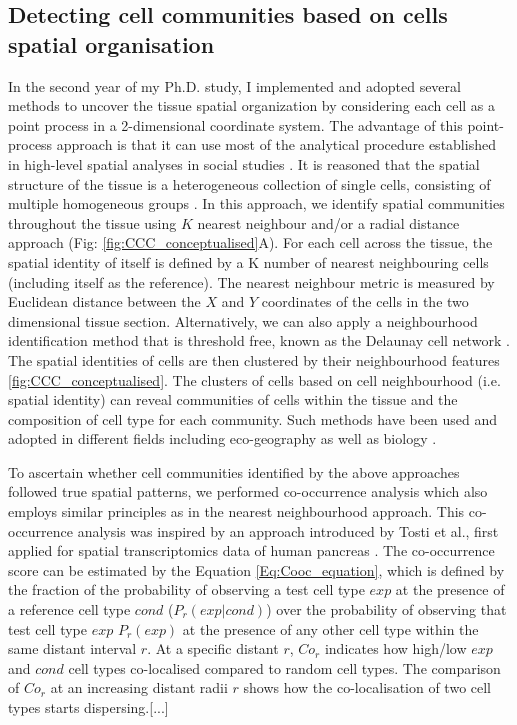\subsection{Detecting cell communities based on cells spatial organisation}
In the second year of my Ph.D. study, I implemented and adopted several methods to uncover the tissue spatial organization by considering each cell as a point process in a 2-dimensional coordinate system. The advantage of this point-process approach is that it can use most of the analytical procedure established in high-level spatial analyses in social studies \cite{yushimito2012voronoi}. It is reasoned that the spatial structure of the tissue is a heterogeneous collection of single cells, consisting of multiple homogeneous groups \cite{schurch2020coordinated}. In this approach, we identify spatial communities throughout the tissue using $K$ nearest neighbour and/or a radial distance approach (Fig: \ref{fig:CCC_conceptualised}A). For each cell across the tissue, the spatial identity of itself is defined by a K number of nearest neighbouring cells (including itself as the reference). The nearest neighbour metric is measured by Euclidean distance between the $X$ and $Y$ coordinates of the cells in the two dimensional tissue section. Alternatively, we can also apply a neighbourhood identification method that is threshold free, known as the Delaunay cell network \cite{guibas1985primitives, dries2021giotto}. The spatial identities of cells are then clustered by their neighbourhood features \ref{fig:CCC_conceptualised}. The clusters of cells based on cell neighbourhood (i.e. spatial identity) can reveal communities of cells within the tissue and the composition of cell type for each community. Such methods have been used and adopted in different fields including eco-geography as well as biology \cite{goltsev2018CODEX, dries2021giotto}.

To ascertain whether cell communities identified by the above approaches followed true spatial patterns, we performed co-occurrence analysis which also employs similar principles as in the nearest neighbourhood approach. This co-occurrence analysis was inspired by an approach introduced by Tosti et al., first applied for spatial transcriptomics data of human pancreas \cite{tosti2021single}. The co-occurrence score can be estimated by the Equation \ref{Eq:Cooc_equation}, which is defined by the fraction of the probability of observing a test cell type $exp$ at the presence of a reference cell type $cond$ ($P_{r}(exp|cond)$) over the probability of observing that test cell type $exp$ $P_{r}(exp)$ at the presence of any other cell type within the same distant interval $r$. At a specific distant $r$, $Co_{r}$ indicates how high/low $exp$ and $cond$ cell types co-localised compared to random cell types. The comparison of $Co_{r}$ at an increasing distant radii $r$ shows how the co-localisation of two cell types starts dispersing.[...]


